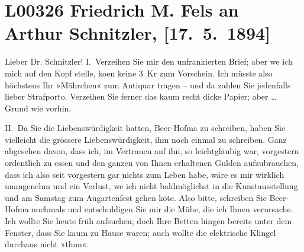 

\section[Friedrich M. Fels an Arthur Schnitzler, {[}17. 5. 1894{]}]{L00326 Friedrich M. Fels an Arthur Schnitzler, {[}17. 5. 1894{]}}
\nopagebreak{}
\rehead{ }\normalsize\beginnumbering{}
\toendnotes[C]{\smallbreak\pagebreak[2]}
\toendnotes[C]{\smallbreak}
\pstart{}{\pb}Lieber Dr. Schnitzler!\pend\vspace{0.5em}
\pstart
           I. Verzeihen Sie mir den unfrankierten Brief; aber we{\geminationn}
               ich mich auf den Kopf stelle, ko{\geminationm}en keine 3 Kr zum
               Vorschein. Ich müsste also höchstens Ihr »Mährchen« zum Antiquar tragen – und da zahlen Sie jedenfalls lieber
               Strafporto. Verzeihen Sie ferner das kaum recht dicke Papier; aber {\dots} Grund wie vorhin.\pend
           
\pstart
           II. Da Sie die Liebenswürdigkeit hatten, Beer-Hofma{\geminationn} zu schreiben, haben Sie vielleicht die grössere Liebenswürdigkeit, ihm noch
               einmal zu schreiben. Ganz abgesehen davon, dass ich, im Vertrauen auf ihn, so
               leichtgläubig war, vorgestern ordentlich zu essen und den ganzen von Ihnen erhaltenen
               Gulden aufzubrauchen, dass ich also seit vorgestern gar nichts zum Leben habe, wäre
               es mir wirklich unangenehm und ein Verlust, we{\geminationn} ich
               nicht baldmöglichst in die Kunstausstellung und am Samstag zum Augartenfest gehen kö{\geminationn}te. Also bitte, schreiben Sie Beer-Hofma{\geminationn} nochmals und entschuldigen Sie mir die Mühe, die ich Ihnen verursache. Ich
               wollte Sie heute früh aufsuchen; doch Ihre Betten hingen bereits {\pb}unter dem Fenster, dass Sie kaum zu Hause waren; auch
               wollte die elektrische Klingel durchaus nicht »thun«.\pend
           
